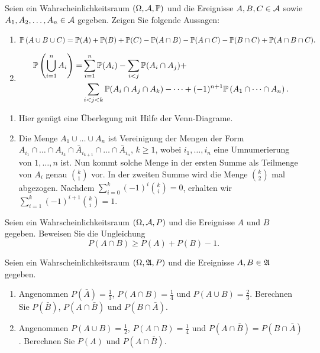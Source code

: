  Seien ein
Wahrscheinlichkeitsraum $\left( \Omega, \mathcal A, \mathbb P \right)$ und die Ereignisse
$A,B,C\in \mathcal A$ sowie $A_1, A_2, \dots, A_n \in \mathcal A$ gegeben.
Zeigen Sie folgende Aussagen:
\begin{enumerate}
    \item \begin{equation*}
            \mathbb P \left( A \cup B \cup C \right) = 
            \mathbb P(A)+\mathbb P(B)+\mathbb P(C) - \mathbb P(A\cap B) - \mathbb P(A\cap C) - \mathbb P(B\cap C) + \mathbb P(A\cap B \cap C). 
        \end{equation*}

    \item
        \begin{align*}
            \mathbb P\left( \bigcup \limits_{i=1}^{n} A_i \right) =&
            \sum_{i=1}^{n} \mathbb P(A_i) - \sum_{i<j} \mathbb P(A_i \cap A_j) + \\
            & \sum_{i<j<k} \mathbb P(A_i \cap A_j \cap A_k) - \dots + 
            (-1)^{n+1} \mathbb P\left( A_1 \cap \dots \cap A_n \right). 
        \end{align*}
\end{enumerate}

\solution 
\begin{enumerate}
    \item Hier genügt eine Überlegung mit Hilfe der Venn-Diagrame. 

    \item Die Menge $A_1 \cup \dots \cup A_n$ ist Vereinigung der Mengen der
        Form $A_{i_1} \cap \dots \cap A_{i_k} \cap \bar A_{i_{k+1}} \cap
        \dots \cap \bar A_{i_{n}}$, $k\geq 1$, wobei $i_1,\dots, i_n$ eine
        Umnumerierung von $1, \dots, n$ ist. Nun kommt solche Menge in der
        ersten Summe als Teilmenge von $A_i$ genau $\binom{k}{1}
        $ vor. In der zweiten Summe wird die Menge $\binom{k}{2}$ mal abgezogen. 
        Nachdem $\sum_{i=0}^{k} (-1)^{i} \binom{k}{i} = 0$, erhalten wir 
        $\sum_{i=1}^{k} (-1)^{i+1} \binom{k}{i}=1$.
\end{enumerate}


 Seien ein
Wahrscheinlichkeitsraum $\left( \Omega, \mathcal A, P \right)$ und die Ereignisse $A$
und $B$ gegeben. Beweisen Sie die Ungleichung $$P(A \cap B) \geq P(A) + P(B) -1.$$

 Seien ein
Wahrscheinlichkeitsraum $\left( \Omega, \mathfrak A, P \right)$ und die Ereignisse $A,
B \in \mathfrak A$ gegeben. 
\begin{enumerate}
    \item Angenommen $P(\bar A)=\frac{1}{3}$, $P(A\cap B)=\frac{1}{4}$ und
        $P(A \cup B)=\frac{2}{3}$. Berechnen Sie $P(\bar B)$, $P(A \cap \bar B)$
        und $P( B \cap \bar A )$.
        
    \item Angenommen $P(A \cup B) = \frac{1}{2}$, $P(A \cap B) = \frac{1}{4}$
        und $P(A \cap \bar B) = P(B \cap \bar A)$. Berechnen Sie $P(A)$ und
        $P(A \cap \bar B)$. 
\end{enumerate}

